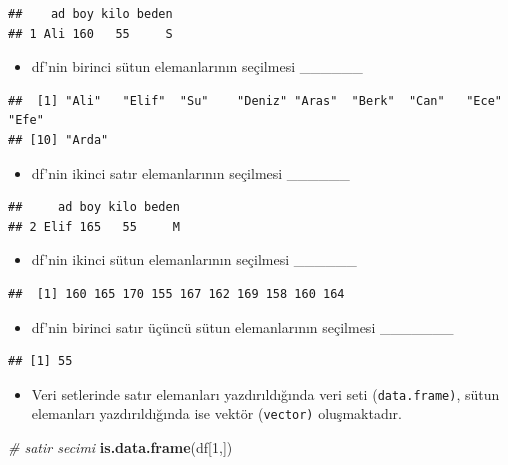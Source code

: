 \documentclass[
  oneside]{book}
\newenvironment{Shaded}{\begin{snugshade}}{\end{snugshade}}
\newcommand{\CommentTok}[1]{\textcolor[rgb]{0.56,0.35,0.01}{\textit{#1}}}
\newcommand{\DecValTok}[1]{\textcolor[rgb]{0.00,0.00,0.81}{#1}}
\newcommand{\FunctionTok}[1]{\textcolor[rgb]{0.13,0.29,0.53}{\textbf{#1}}}
\newcommand{\NormalTok}[1]{#1}
\providecommand{\tightlist}{%
  \setlength{\itemsep}{0pt}\setlength{\parskip}{0pt}}
\begin{document}
\begin{verbatim}
##    ad boy kilo beden
## 1 Ali 160   55     S
\end{verbatim}

\begin{itemize}
\tightlist
\item
  df'nin birinci sütun elemanlarının seçilmesi \_\_\_\_\_\_
\end{itemize}

\begin{verbatim}
##  [1] "Ali"   "Elif"  "Su"    "Deniz" "Aras"  "Berk"  "Can"   "Ece"   "Efe"  
## [10] "Arda"
\end{verbatim}

\begin{itemize}
\tightlist
\item
  df'nin ikinci satır elemanlarının seçilmesi \_\_\_\_\_\_
\end{itemize}

\begin{verbatim}
##     ad boy kilo beden
## 2 Elif 165   55     M
\end{verbatim}

\begin{itemize}
\tightlist
\item
  df'nin ikinci sütun elemanlarının seçilmesi \_\_\_\_\_\_
\end{itemize}

\begin{verbatim}
##  [1] 160 165 170 155 167 162 169 158 160 164
\end{verbatim}

\begin{itemize}
\tightlist
\item
  df'nin birinci satır üçüncü sütun elemanlarının seçilmesi \_\_\_\_\_\_\_
\end{itemize}

\begin{verbatim}
## [1] 55
\end{verbatim}

\begin{itemize}
\tightlist
\item
  Veri setlerinde satır elemanları yazdırıldığında veri seti (\texttt{data.frame)}, sütun elemanları yazdırıldığında ise vektör (\texttt{vector)} oluşmaktadır.
\end{itemize}

\begin{Shaded}
\begin{Highlighting}[]
\CommentTok{\# satir secimi}
\FunctionTok{is.data.frame}\NormalTok{(df[}\DecValTok{1}\NormalTok{,])}
\end{Highlighting}
\end{Shaded}
\end{document}
